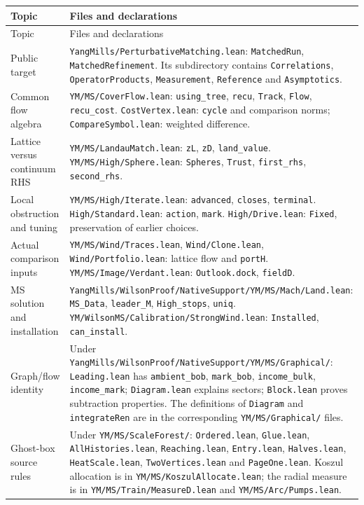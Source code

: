 \documentclass[11pt]{article}
\newcommand{\code}[1]{{\small\nolinkurl{#1}}}
\begin{document}
\begingroup\small
\begin{longtable}{@{}>{\raggedright\arraybackslash}p{}>{\raggedright\arraybackslash}p{}@{}}
\toprule Topic & Files and declarations\\\midrule
\endfirsthead
\toprule Topic & Files and declarations\\\midrule
\endhead
Public target & \code{YangMills/PerturbativeMatching.lean}: \code{MatchedRun}, \code{MatchedRefinement}. Its subdirectory contains \code{Correlations}, \code{OperatorProducts}, \code{Measurement}, \code{Reference} and \code{Asymptotics}.\\[4pt]
Common flow algebra & \code{YM/MS/CoverFlow.lean}: \code{using_tree}, \code{recu}, \code{Track}, \code{Flow}, \code{recu_cost}. \code{CostVertex.lean}: \code{cycle} and comparison norms; \code{CompareSymbol.lean}: weighted difference.\\[4pt]
Lattice versus continuum RHS & \code{YM/MS/LandauMatch.lean}: \code{zL}, \code{zD}, \code{land_value}. \code{YM/MS/High/Sphere.lean}: \code{Spheres}, \code{Trust}, \code{first_rhs}, \code{second_rhs}.\\[4pt]
Local obstruction and tuning & \code{YM/MS/High/Iterate.lean}: \code{advanced}, \code{closes}, \code{terminal}. \code{High/Standard.lean}: \code{action}, \code{mark}. \code{High/Drive.lean}: \code{Fixed}, preservation of earlier choices.\\[4pt]
Actual comparison inputs & \code{YM/MS/Wind/Traces.lean}, \code{Wind/Clone.lean}, \code{Wind/Portfolio.lean}: lattice flow and \code{portH}. \code{YM/MS/Image/Verdant.lean}: \code{Outlook.dock}, \code{fieldD}.\\[4pt]
MS solution and installation & \code{YangMills/WilsonProof/NativeSupport/YM/MS/Mach/Land.lean}: \code{MS_Data}, \code{leader_M}, \code{High_stops}, \code{uniq}. \code{YM/WilsonMS/Calibration/StrongWind.lean}: \code{Installed}, \code{can_install}.\\[4pt]
Graph/flow identity & Under \code{YangMills/WilsonProof/NativeSupport/YM/MS/Graphical/}: \code{Leading.lean} has \code{ambient_bob}, \code{mark_bob}, \code{income_bulk}, \code{income_mark}; \code{Diagram.lean} explains sectors; \code{Block.lean} proves subtraction properties. The definitions of \code{Diagram} and \code{integrateRen} are in the corresponding \code{YM/MS/Graphical/} files.\\[4pt]
Ghost-box source rules & Under \code{YM/MS/ScaleForest/}: \code{Ordered.lean}, \code{Glue.lean}, \code{AllHistories.lean}, \code{Reaching.lean}, \code{Entry.lean}, \code{Halves.lean}, \code{HeatScale.lean}, \code{TwoVertices.lean} and \code{PageOne.lean}. Koszul allocation is in \code{YM/MS/KoszulAllocate.lean}; the radial measure is in \code{YM/MS/Train/MeasureD.lean} and \code{YM/MS/Arc/Pumps.lean}.\\[4pt]

\end{longtable}
\end{document}
